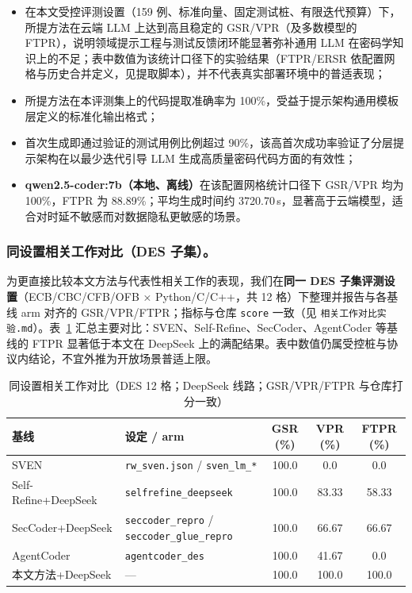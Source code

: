 \documentclass[12pt]{llncs}
\begin{document}
\begin{itemize}[leftmargin=1.2em, labelsep=0.4em]
  \item 在本文受控评测设置（159 例、标准向量、固定测试桩、有限迭代预算）下，所提方法在云端 LLM 上达到高且稳定的 GSR/VPR（及多数模型的 FTPR），说明领域提示工程与测试反馈闭环能显著弥补通用 LLM 在密码学知识上的不足；表中数值为该统计口径下的实验结果（FTPR/ERSR 依配置网格与历史合并定义，见提取脚本），并不代表真实部署环境中的普适表现；
  \item 所提方法在本评测集上的代码提取准确率为 100\%，受益于提示架构通用模板层定义的标准化输出格式；
  \item 首次生成即通过验证的测试用例比例超过 90\%，该高首次成功率验证了分层提示架构在以最少迭代引导 LLM 生成高质量密码代码方面的有效性；
  \item \textbf{qwen2.5-coder:7b（本地、离线）}在该配置网格统计口径下 GSR/VPR 均为 100\%，FTPR 为 88.89\%；平均生成时间约 3720.70\,s，显著高于云端模型，适合对时延不敏感而对数据隐私更敏感的场景。
\end{itemize}

\subsubsection{同设置相关工作对比（DES 子集）。}
为更直接比较本文方法与代表性相关工作的表现，我们在\textbf{同一 DES 子集评测设置}（ECB/CBC/CFB/OFB × Python/C/C++，共 12 格）下整理并报告与各基线 arm 对齐的 GSR/VPR/FTPR；指标与仓库 \texttt{score} 一致（见 \texttt{相关工作对比实验.md}）。表~\ref{tab:rw_same_protocol_des} 汇总主要对比：SVEN、Self-Refine、SecCoder、AgentCoder 等基线的 FTPR 显著低于本文在 DeepSeek 上的满配结果。表中数值仍属受控桩与协议内结论，不宜外推为开放场景普适上限。

\begin{table}[H]
  \centering
  \footnotesize
  \caption{同设置相关工作对比（DES 12 格；DeepSeek 线路；GSR/VPR/FTPR 与仓库打分一致）}
  \label{tab:rw_same_protocol_des}
  \setlength{\tabcolsep}{4pt}
  \begin{tabular}{p{} p{} c c c}
    \toprule
    基线 & 设定 / arm & GSR (\%) & VPR (\%) & FTPR (\%) \\
    \midrule
    SVEN & \texttt{rw\_sven.json} / \texttt{sven\_lm\_*} & 100.0 & 0.0 & 0.0 \\
    Self-Refine+DeepSeek & \texttt{selfrefine\_deepseek} & 100.0 & 83.33 & 58.33 \\
    SecCoder+DeepSeek & \texttt{seccoder\_repro} / \texttt{seccoder\_glue\_repro} & 100.0 & 66.67 & 66.67 \\
    AgentCoder & \texttt{agentcoder\_des} & 100.0 & 41.67 & 0.0 \\
    本文方法+DeepSeek & --- & 100.0 & 100.0 & 100.0 \\
    \bottomrule
  \end{tabular}
\end{table}
\end{document}
